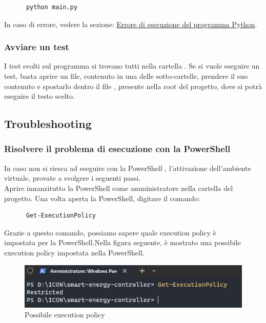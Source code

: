\documentclass[12pt, letterpaper]{article}
\begin{document}
\begin{verbatim}
      python main.py
\end{verbatim}

\noindent In caso di errore, vedere la sezione:
\hyperref[sec:python-error]{Errore di esecuzione del programma Python}.

\subsubsection{Avviare un test}

I test svolti sul programma si trovano tutti nella cartella . Se si vuole eseguire un
test, basta aprire un file, contenuto in una delle sotto-cartelle, prendere il suo contenuto e spostarlo
dentro il file , presente nella root del progetto, dove si potrà eseguire il testo scelto.

\subsection{Troubleshooting}

\subsubsection{Risolvere il problema di esecuzione con la PowerShell}
\label{sec:powershell-error}

In caso non si riesca ad eseguire con la PowerShell \cite{power-shell-resolution},
l'attivazione dell'ambiente virtuale, provate a svolgere i seguenti passi. \\

\noindent Aprire innanzitutto la PowerShell come amministratore nella cartella del progetto.
Una volta aperta la PowerShell, digitare il comando: \\

\begin{verbatim}
      Get-ExecutionPolicy
\end{verbatim}

\noindent Grazie a questo comando, possiamo sapere quale execution policy è \\
impostata per la PowerShell.Nella figura seguente, è mostrato una
possibile execution policy impostata nella PowerShell. \\

\begin{figure}[h]
      \centering
      \includegraphics{powershell-error.png}
      \caption{Possibile execution policy}
\end{figure}
\end{document}

